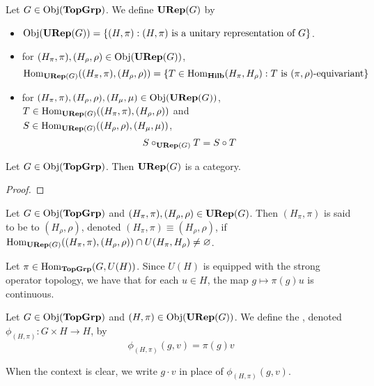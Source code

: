 \documentclass{book}
\begin{document}
	\begin{defn} 
		Let $G \in \operatorname{Obj}(\operatorname*{\text{\textbf{TopGrp}}})$. We define $\operatorname*{\text{\textbf{URep}}}(G)$ by 
		\begin{itemize}
			\item $\operatorname{Obj}(\operatorname*{\text{\textbf{URep}}}(G)) = \{(H, \pi): (H, \pi) \text{ is a unitary representation of $G$}\}$.
			\item for $(H_{\pi}, \pi),(H_{\rho}, \rho) \in \operatorname{Obj}(\operatorname*{\text{\textbf{URep}}}(G))$, 
			$$\operatorname{Hom}_{\operatorname*{\text{\textbf{URep}}}(G)}((H_{\pi}, \pi), (H_{\rho}, \rho)) = \{T \in \operatorname{Hom}_{\operatorname*{\text{\textbf{Hilb}}}}(H_{\pi}, H_{\rho}): T \text{ is $(\pi, \rho)$-equivariant} \}$$
			\item for $(H_{\pi}, \pi), (H_{\rho}, \rho), (H_{\mu}, \mu) \in \operatorname{Obj}(\operatorname*{\text{\textbf{URep}}}(G))$, $T \in \operatorname{Hom}_{\operatorname*{\text{\textbf{URep}}}(G)}((H_{\pi}, \pi), (H_{\rho}, \rho))$ and \\
			$S \in  \operatorname{Hom}_{\operatorname*{\text{\textbf{URep}}}(G)}((H_{\rho}, \rho), (H_{\mu}, \mu))$, 
			$$S \circ_{\operatorname*{\text{\textbf{URep}}}(G)} T = S \circ T$$
		\end{itemize}
	\end{defn}
	
	\begin{ex}
		Let $G \in \operatorname{Obj}(\operatorname*{\text{\textbf{TopGrp}}})$. Then $\operatorname*{\text{\textbf{URep}}}(G)$ is a category.
	\end{ex}
	
	\begin{proof}
	\end{proof}
	
	\begin{defn}
		Let $G \in \operatorname{Obj}(\operatorname*{\text{\textbf{TopGrp}}})$ and $(H_{\pi}, \pi), (H_{\rho}, \rho) \in \operatorname*{\text{\textbf{URep}}}(G)$. Then $(H_{\pi}, \pi)$ is said to be  to $(H_{\rho}, \rho)$, denoted $(H_{\pi}, \pi) \equiv (H_{\rho}, \rho)$, if $\operatorname{Hom}_{\operatorname*{\text{\textbf{URep}}}(G)}((H_{\pi}, \pi), (H_{\rho}, \rho)) \cap U(H_{\pi}, H_{\rho}) \neq \varnothing$.
	\end{defn}
	
	\begin{note}
		Let $\pi \in \operatorname{Hom}_{\operatorname*{\text{\textbf{TopGrp}}}}(G, U(H))$. Since $U(H)$ is equipped with the strong operator topology, we have that for each $u \in H$, the map $g \mapsto \pi(g)u$ is continuous.  
	\end{note}
	
	\begin{defn}
		Let $G \in \operatorname{Obj}(\operatorname*{\text{\textbf{TopGrp}}})$ and $(H, \pi) \in \operatorname{Obj}(\operatorname*{\text{\textbf{URep}}}(G))$. We define the , denoted $\phi_{(H, \pi)}: G \times H \rightarrow H$, by 
		$$\phi_{(H, \pi)}(g, v) = \pi(g)v$$ 
	\end{defn}
	
	\begin{note}
		When the context is clear, we write $g \cdot v$ in place of $\phi_{(H, \pi)}(g, v)$. 
	\end{note}
	
\end{document}
